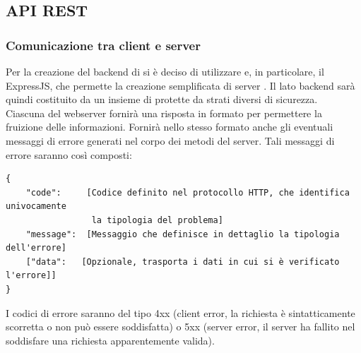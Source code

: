 \subsection{API REST}
\subsubsection{Comunicazione tra client e server}
Per la creazione del backend di  si è deciso di utilizzare  e, in particolare, il  ExpressJS, che permette la creazione semplificata di server . Il lato backend sarà quindi costituito da un insieme di  protette da strati diversi di sicurezza. \\
Ciascuna  del webserver fornirà una risposta in formato  per permettere la fruizione delle informazioni. Fornirà nello stesso formato anche gli eventuali messaggi di errore generati nel corpo dei metodi del server. Tali messaggi di errore saranno così composti: 
\begin{verbatim}
{
    "code":     [Codice definito nel protocollo HTTP, che identifica univocamente
                 la tipologia del problema]
    "message":  [Messaggio che definisce in dettaglio la tipologia dell'errore]
    ["data":   [Opzionale, trasporta i dati in cui si è verificato l'errore]]
}
\end{verbatim}
I codici di errore saranno del tipo 4xx (client error, la richiesta è sintatticamente scorretta o non può essere soddisfatta) o 5xx (server error, il server ha fallito nel soddisfare una richiesta apparentemente valida).
